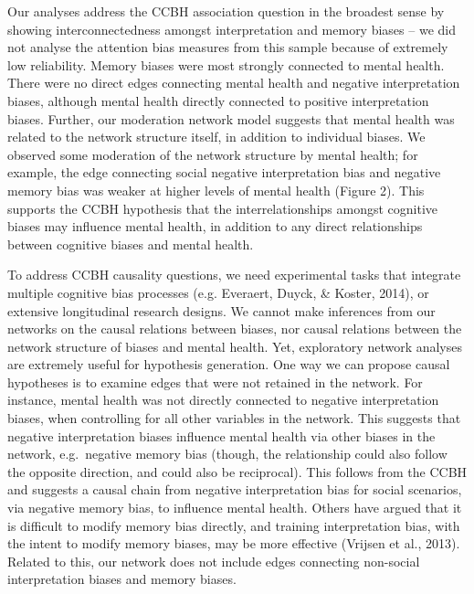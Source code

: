 \documentclass[
  english,
  man]{apa6}
\begin{document}
Our analyses address the CCBH association question in the broadest sense by showing interconnectedness amongst interpretation and memory biases -- we did not analyse the attention bias measures from this sample because of extremely low reliability. Memory biases were most strongly connected to mental health. There were no direct edges connecting mental health and negative interpretation biases, although mental health directly connected to positive interpretation biases. Further, our moderation network model suggests that mental health was related to the network structure itself, in addition to individual biases. We observed some moderation of the network structure by mental health; for example, the edge connecting social negative interpretation bias and negative memory bias was weaker at higher levels of mental health (Figure 2). This supports the CCBH hypothesis that the interrelationships amongst cognitive biases may influence mental health, in addition to any direct relationships between cognitive biases and mental health.

To address CCBH causality questions, we need experimental tasks that integrate multiple cognitive bias processes (e.g. Everaert, Duyck, \& Koster, 2014), or extensive longitudinal research designs. We cannot make inferences from our networks on the causal relations between biases, nor causal relations between the network structure of biases and mental health. Yet, exploratory network analyses are extremely useful for hypothesis generation. One way we can propose causal hypotheses is to examine edges that were not retained in the network. For instance, mental health was not directly connected to negative interpretation biases, when controlling for all other variables in the network. This suggests that negative interpretation biases influence mental health via other biases in the network, e.g.~negative memory bias (though, the relationship could also follow the opposite direction, and could also be reciprocal). This follows from the CCBH and suggests a causal chain from negative interpretation bias for social scenarios, via negative memory bias, to influence mental health. Others have argued that it is difficult to modify memory bias directly, and training interpretation bias, with the intent to modify memory biases, may be more effective (Vrijsen et al., 2013). Related to this, our network does not include edges connecting non-social interpretation biases and memory biases.
\end{document}
